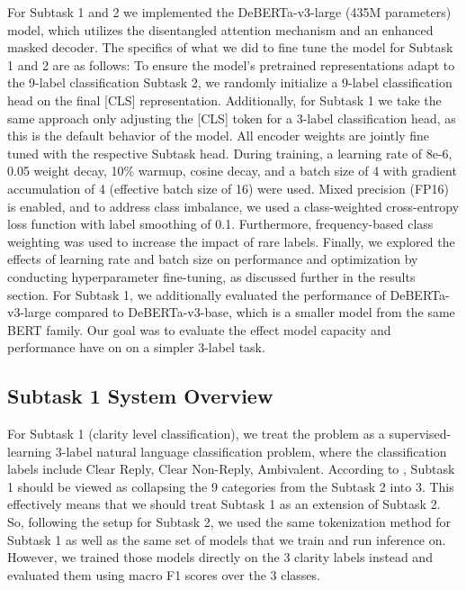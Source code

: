 \documentclass[11pt]{article}
\begin{document}
For Subtask 1 and 2 we implemented the DeBERTa-v3-large (435M parameters) model, which utilizes the disentangled attention mechanism and an enhanced masked decoder. The specifics of what we did to fine tune the model for Subtask 1 and 2 are as follows: To ensure the model’s pretrained representations adapt to the 9-label classification Subtask 2, we randomly initialize a 9-label classification head on the final [CLS] representation. Additionally, for Subtask 1 we take the same approach only adjusting the [CLS] token for a 3-label classification head, as this is the default behavior of the model. All encoder weights are jointly fine tuned with the respective Subtask head. During training, a learning rate of 8e-6, 0.05 weight decay, 10\% warmup, cosine decay, and a batch size of 4 with gradient accumulation of 4 (effective batch size of 16) were used. Mixed precision (FP16) is enabled, and to address class imbalance, we used a class-weighted cross-entropy loss function with label smoothing of 0.1. Furthermore, frequency-based class weighting was used to increase the impact of rare labels. Finally, we explored the effects of learning rate and batch size on performance and optimization by conducting hyperparameter fine-tuning, as discussed further in the results section. For Subtask 1, we additionally evaluated the performance of DeBERTa-v3-large compared to DeBERTa-v3-base, which is a smaller model from the same BERT family. Our goal was to evaluate the effect model capacity and performance have on on a simpler 3-label task.



\subsection{Subtask 1 System Overview}
For Subtask 1 (clarity level classification), we treat the problem as a supervised-learning 3-label natural language classification problem, where the classification labels include Clear Reply, Clear Non-Reply, Ambivalent. According to \citet{thomas2024isaidthatdataset}, Subtask 1 should be viewed as collapsing the 9 categories from the Subtask 2 into 3. This effectively means that we should treat Subtask 1 as an extension of Subtask 2. So, following the setup for Subtask 2, we used the same tokenization method for Subtask 1 as well as the same set of models that we train and run inference on. However, we trained those models directly on the 3 clarity labels instead and evaluated them using macro F1 scores over the 3 classes.
\end{document}
